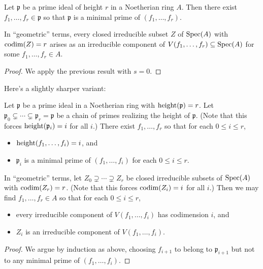 \documentclass[10pt]{article}
\begin{document}
\begin{corollary}\label{cor:existence-parameters-for-prime}
  Let $\mathfrak{p}$ be a prime ideal of height $r$ in a
  Noetherian ring $A$.  Then there exist
  $f_1,\dotsc,f_r \in \mathfrak{p}$ so that $\mathfrak{p}$ is a
  minimal prime of $(f_1,\dotsc,f_r)$.  

  In ``geometric'' terms, every closed irreducible subset $Z$ of
  $\operatorname{Spec}(A)$ with $\operatorname{codim}(Z) = r$ arises as an irreducible
  component of $V(f_1,\dotsc,f_r) \subseteq \operatorname{Spec}(A)$ for some
  $f_1,\dotsc,f_r \in A$.
\end{corollary}
\begin{proof}
  We apply the previous result
  with $s = 0$.
\end{proof}

Here's a slightly sharper variant:
\begin{theorem}
  Let $\mathfrak{p}$ be a prime ideal in a Noetherian ring
  with $\operatorname{height}(\mathfrak{p}) = r$.
  Let
  $\mathfrak{p}_0 \subsetneq \dotsb \subsetneq \mathfrak{p}_r =
  \mathfrak{p}$ be a chain of primes
  realizing the height of $\mathfrak{p}$.
  (Note that this forces $\operatorname{height}(\mathfrak{p}_i) = i$ for all $i$.)
  There exist
  $f_1,\dotsc,f_r$ so that
  for each $0 \leq i \leq r$,
  \begin{itemize}
  \item $\operatorname{height}(f_1,\dotsc,f_i) = i$, and
  \item $\mathfrak{p}_i$ is a
    minimal prime of $(f_1,\dotsc,f_i)$ for each $0 \leq i \leq
    r$.
  \end{itemize}

  In ``geometric'' terms,
  let $Z_0 \supsetneq \dotsb \supsetneq Z_r$
  be closed irreducible subsets of $\operatorname{Spec}(A)$
  with $\operatorname{codim}(Z_r) = r$.
  (Note that this forces $\operatorname{codim}(Z_i) = i$ for all $i$.)
  Then we may find $f_1,\dotsc,f_r \in A$
  so that for each $0 \leq i \leq r$,
  \begin{itemize}
  \item every irreducible component of $V(f_1,\dotsc,f_i)$
    has codimension $i$, and
  \item $Z_i$ is an irreducible component of
    $V(f_1,\dotsc,f_i)$.
  \end{itemize}
\end{theorem}
\begin{proof}
  We argue by induction as above,
  choosing $f_{i+1}$ to belong to $\mathfrak{p}_{i+1}$
  but not to any minimal prime of $(f_1,\dotsc,f_i)$.
\end{proof}
\end{document}
